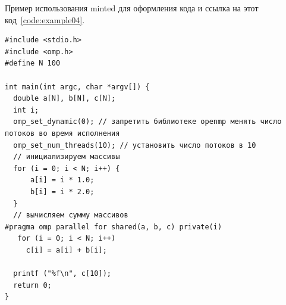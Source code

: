 Пример использования minted для оформления кода и ссылка на этот код~\ref{code:example04}.
\begin{code}
\vspace{-\baselineskip}\begin{verbatim}
#include <stdio.h>
#include <omp.h>
#define N 100

int main(int argc, char *argv[]) {
  double a[N], b[N], c[N];
  int i;
  omp_set_dynamic(0); // запретить библиотеке openmp менять число потоков во время исполнения
  omp_set_num_threads(10); // установить число потоков в 10
  // инициализируем массивы
  for (i = 0; i < N; i++) {
      a[i] = i * 1.0;
      b[i] = i * 2.0;
  }
  // вычисляем сумму массивов
#pragma omp parallel for shared(a, b, c) private(i)
   for (i = 0; i < N; i++)
     c[i] = a[i] + b[i];

  printf ("%f\n", c[10]);
  return 0;
}
\end{verbatim}
\end{code}
